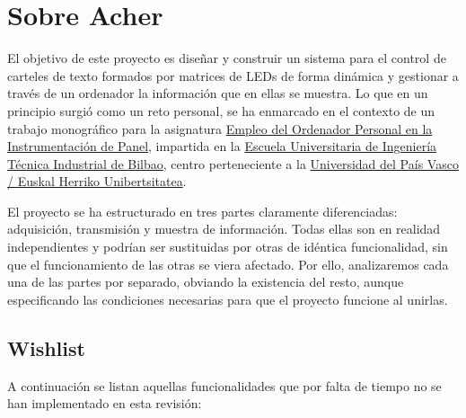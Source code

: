 \section{Sobre Acher}

El objetivo de este proyecto es diseñar y construir un sistema para el control de carteles de texto formados por matrices de LEDs de forma dinámica y gestionar a través de un ordenador la información que en ellas se muestra. Lo que en un principio surgió como un reto personal, se ha enmarcado en el contexto de un trabajo monográfico para la asignatura \href{http://www.industria-ingeniaritza-tekniko-bilbao.ehu.es/p229-content/es/contenidos/informacion/euiti_bi_iti_electronica/es_oferta/adjuntos/19797.pdf}{Empleo del Ordenador Personal en la Instrumentación de Panel}, impartida en la \href{http://www.industria-ingeniaritza-tekniko-bilbao.ehu.es/}{Escuela Universitaria de Ingeniería Técnica Industrial de Bilbao}, centro perteneciente a la \href{http://ehu.es/}{Universidad del País Vasco / Euskal Herriko Unibertsitatea}.

El proyecto se ha estructurado en tres partes claramente diferenciadas: adquisición, transmisión y muestra de información. Todas ellas son en realidad independientes y podrían ser sustituidas por otras de idéntica funcionalidad, sin que el funcionamiento de las otras se viera afectado. Por ello, analizaremos cada una de las partes por separado, obviando la existencia del resto, aunque especificando las condiciones necesarias para que el proyecto funcione al unirlas. 

\subsection{Wishlist}

A continuación se listan aquellas funcionalidades que por falta de tiempo no se han implementado en esta revisión:

